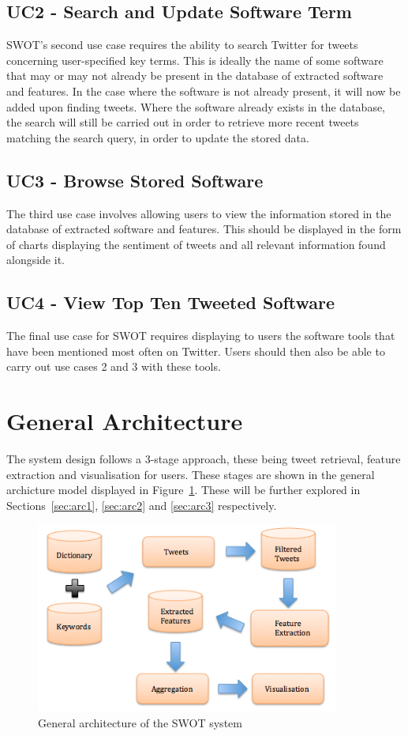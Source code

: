 \subsection[Use Case 2]{UC2 - Search and Update Software Term}
\label{sec:uc2}
SWOT's second use case requires the ability to search Twitter for tweets concerning user-specified key terms. This is ideally the name of some software that may or may not already be present in the database of extracted software and features. In the case where the software is not already present, it will now be added upon finding tweets. Where the software already exists in the database, the search will still be carried out in order to retrieve more recent tweets matching the search query, in order to update the stored data.

\subsection[Use Case 3]{UC3 - Browse Stored Software}
\label{sec:uc3}
The third use case involves allowing users to view the information stored in the database of extracted software and features. This should be displayed in the form of charts displaying the sentiment of tweets and all relevant information found alongside it.

\subsection[Use Case 4]{UC4 - View Top Ten Tweeted Software}
\label{sec:uc4}
The final use case for SWOT requires displaying to users the software tools that have been mentioned most often on Twitter. Users should then also be able to carry out use cases 2 and 3 with these tools.

\section{General Architecture}
The system design follows a 3-stage approach, these being tweet retrieval, feature extraction and visualisation for users. These stages are shown in the general archicture model displayed in Figure~\ref{fig:general}. These will be further explored in Sections~\ref{sec:arc1}, \ref{sec:arc2} and \ref{sec:arc3} respectively.

\begin{figure}[h]
\begin{center}
\includegraphics[width=10cm]{design}
\end{center}
\caption{General architecture of the SWOT system}
\label{fig:general}
\end{figure}

